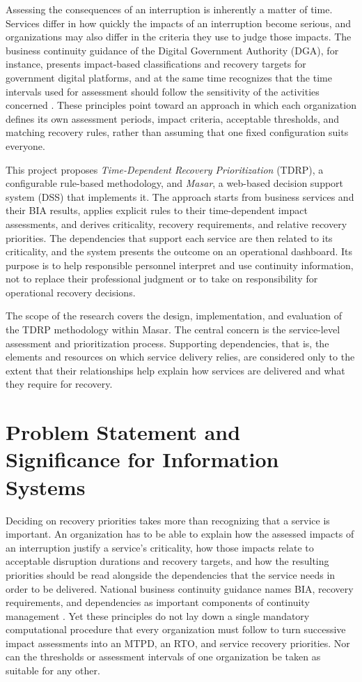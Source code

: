 Assessing the consequences of an interruption is inherently a matter of time. Services differ in how quickly the impacts of an interruption become serious, and organizations may also differ in the criteria they use to judge those impacts. The business continuity guidance of the Digital Government Authority (DGA), for instance, presents impact-based classifications and recovery targets for government digital platforms, and at the same time recognizes that the time intervals used for assessment should follow the sensitivity of the activities concerned \cite{dga2025bcm}. These principles point toward an approach in which each organization defines its own assessment periods, impact criteria, acceptable thresholds, and matching recovery rules, rather than assuming that one fixed configuration suits everyone.

This project proposes \emph{Time-Dependent Recovery Prioritization} (TDRP), a configurable rule-based methodology, and \emph{Masar}, a web-based decision support system (DSS) that implements it. The approach starts from business services and their BIA results, applies explicit rules to their time-dependent impact assessments, and derives criticality, recovery requirements, and relative recovery priorities. The dependencies that support each service are then related to its criticality, and the system presents the outcome on an operational dashboard. Its purpose is to help responsible personnel interpret and use continuity information, not to replace their professional judgment or to take on responsibility for operational recovery decisions.

The scope of the research covers the design, implementation, and evaluation of the TDRP methodology within Masar. The central concern is the service-level assessment and prioritization process. Supporting dependencies, that is, the elements and resources on which service delivery relies, are considered only to the extent that their relationships help explain how services are delivered and what they require for recovery.

\section{Problem Statement and Significance for Information Systems}
\label{sec:problem_significance}

Deciding on recovery priorities takes more than recognizing that a service is important. An organization has to be able to explain how the assessed impacts of an interruption justify a service's criticality, how those impacts relate to acceptable disruption durations and recovery targets, and how the resulting priorities should be read alongside the dependencies that the service needs in order to be delivered. National business continuity guidance names BIA, recovery requirements, and dependencies as important components of continuity management \cite{nrcnationalframework,dga2025bcm}. Yet these principles do not lay down a single mandatory computational procedure that every organization must follow to turn successive impact assessments into an MTPD, an RTO, and service recovery priorities. Nor can the thresholds or assessment intervals of one organization be taken as suitable for any other.

